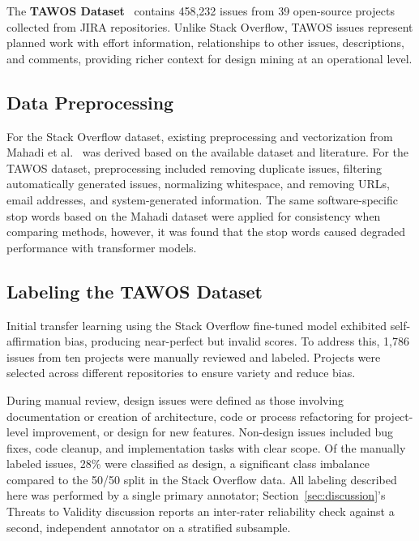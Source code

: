 \documentclass[preprint,12pt]{elsarticle}
\begin{document}
The \textbf{TAWOS Dataset}~\cite{tawosi2022} contains 458,232 issues from 39 open-source projects collected from JIRA repositories. Unlike Stack Overflow, TAWOS issues represent planned work with effort information, relationships to other issues, descriptions, and comments, providing richer context for design mining at an operational level.

\subsection{Data Preprocessing}

For the Stack Overflow dataset, existing preprocessing and vectorization from Mahadi et al.~\cite{mahadi2021} was derived based on the available dataset and literature. For the TAWOS dataset, preprocessing included removing duplicate issues, filtering automatically generated issues, normalizing whitespace, and removing URLs, email addresses, and system-generated information. The same software-specific stop words based on the Mahadi dataset were applied for consistency when comparing methods, however, it was found that the stop words caused degraded performance with transformer models.

\subsection{Labeling the TAWOS Dataset}
\label{sec:labeling}

Initial transfer learning using the Stack Overflow fine-tuned model exhibited self-affirmation bias, producing near-perfect but invalid scores. To address this, 1,786 issues from ten projects were manually reviewed and labeled. Projects were selected across different repositories to ensure variety and reduce bias.

During manual review, design issues were defined as those involving documentation or creation of architecture, code or process refactoring for project-level improvement, or design for new features. Non-design issues included bug fixes, code cleanup, and implementation tasks with clear scope. Of the manually labeled issues, 28\% were classified as design, a significant class imbalance compared to the 50/50 split in the Stack Overflow data. All labeling described here was performed by a single primary annotator; Section~\ref{sec:discussion}'s Threats to Validity discussion reports an inter-rater reliability check against a second, independent annotator on a stratified subsample.
\end{document}
